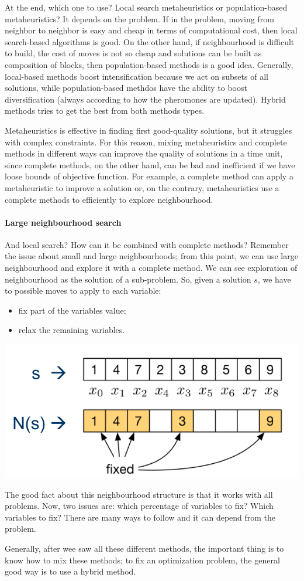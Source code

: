 \documentclass[10pt,a4paper]{article}
\begin{document}
At the end, which one to use? Local search metaheuristics or population-based
metaheuristics? It depends on the problem. If in the problem, moving from
neighbor to neighbor is easy and cheap in terms of computational cost, then
local search-based algorithms is good. On the other hand, if neighbourhood is
difficult to build, the cost of moves is not so cheap and solutions can be built
as composition of blocks, then population-based methods is a good idea.
Generally, local-based methods boost intensification because we act on subsets
of all solutions, while population-based methdos have the ability to boost
diversification (always according to how the pheromones are updated). Hybrid
methods tries to get the best from both methods types.

Metaheuristics is effective in finding first good-quality solutions, but it
struggles with complex constraints. For this reason, mixing metaheuristics and
complete methods in different ways can improve the quality of solutions in a
time unit, since complete methods, on the other hand, can be bad and inefficient
if we have loose bounds of objective function. For example, a complete method
can apply a metaheuristic to improve a solution or, on the contrary,
metaheuristics use a complete methods to efficiently to explore neighbourhood.

\paragraph{Large neighbourhood search}
And local search? How can it be combined with complete methods? Remember the
issue about small and large neighbourhoods; from this point, we can use large
neighbourhood and explore it with a complete method. We can see exploration of
neighbourhood as the solution of a sub-problem. So, given a solution $s$, we
have to possible moves to apply to each variable:
\begin{itemize}
    \item fix part of the variables value;
    \item relax the remaining variables.
\end{itemize}
\includegraphics[scale=0.25]{fix_relax.png}

The good fact about this neighbourhood structure is that it works with all
problems. Now, two issues are: which percentage of variables to fix? Which
variables to fix? There are many ways to follow and it can depend from the
problem.

Generally, after wee saw all these different methods, the important thing is to
know how to mix these methods; to fix an optimization problem, the general good
way is to use a hybrid method.
\end{document}
